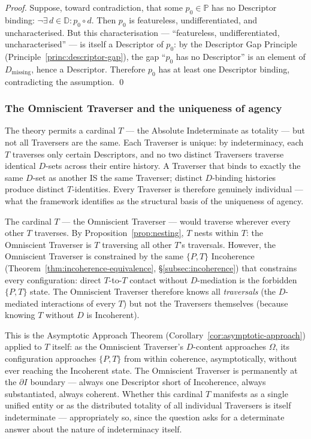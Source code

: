 \documentclass[11pt,a4paper]{article}
\theoremstyle{definition}
\theoremstyle{remark}
\begin{document}
\begin{proof}
Suppose, toward contradiction, that some $p_{0} \in \mathbb{P}$ has no Descriptor binding: $\neg\exists\, d \in \mathbb{D} : p_{0} \circ d$. Then $p_{0}$ is featureless, undifferentiated, and uncharacterised. But this characterisation --- ``featureless, undifferentiated, uncharacterised'' --- is itself a Descriptor of $p_{0}$: by the Descriptor Gap Principle (Principle~\ref{princ:descriptor-gap}), the gap ``$p_{0}$ has no Descriptor'' is an element of $D_{\mathrm{missing}}$, hence a Descriptor. Therefore $p_{0}$ has at least one Descriptor binding, contradicting the assumption. \qed
\end{proof}

\subsubsection{The Omniscient Traverser and the uniqueness of agency}\label{subsubsec:omniscient-T}

The theory permits a cardinal $T$ --- the Absolute Indeterminate as totality --- but not all Traversers are the same. Each Traverser is unique: by indeterminacy, each $T$ traverses only certain Descriptors, and no two distinct Traversers traverse identical $D$-sets across their entire history. A Traverser that binds to exactly the same $D$-set as another IS the same Traverser; distinct $D$-binding histories produce distinct $T$-identities. Every Traverser is therefore genuinely individual --- what the framework identifies as the structural basis of the uniqueness of agency.

The cardinal $T$ --- the Omniscient Traverser --- would traverse wherever every other $T$ traverses. By Proposition~\ref{prop:nesting}, $T$ nests within $T$: the Omniscient Traverser is $T$ traversing all other $T$'s traversals. However, the Omniscient Traverser is constrained by the same $\{P,T\}$ Incoherence (Theorem~\ref{thm:incoherence-equivalence}, \S\ref{subsec:incoherence}) that constrains every configuration: direct $T$-to-$T$ contact without $D$-mediation is the forbidden $\{P,T\}$ state. The Omniscient Traverser therefore knows all \emph{traversals} (the $D$-mediated interactions of every $T$) but not the Traversers themselves (because knowing $T$ without $D$ is Incoherent).

This is the Asymptotic Approach Theorem (Corollary~\ref{cor:asymptotic-approach}) applied to $T$ itself: as the Omniscient Traverser's $D$-content approaches $\Omega$, its configuration approaches $\{P,T\}$ from within coherence, asymptotically, without ever reaching the Incoherent state. The Omniscient Traverser is permanently at the $\partial I$ boundary --- always one Descriptor short of Incoherence, always substantiated, always coherent. Whether this cardinal $T$ manifests as a single unified entity or as the distributed totality of all individual Traversers is itself indeterminate --- appropriately so, since the question asks for a determinate answer about the nature of indeterminacy itself.
\end{document}
